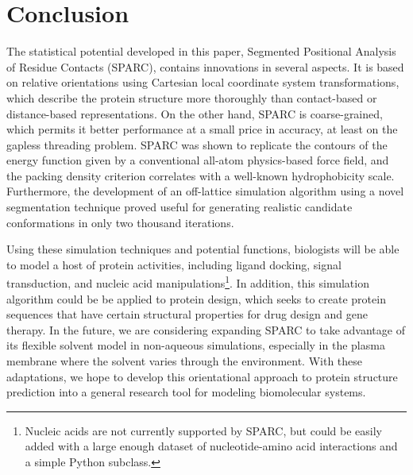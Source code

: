 \documentclass[11pt,titlepage]{article}
\begin{document}
\section{Conclusion}
The statistical potential developed in this paper, Segmented Positional Analysis of Residue Contacts (SPARC), contains innovations in several aspects. 
It is based on relative orientations using Cartesian local coordinate system transformations, which describe the protein structure more thoroughly than contact-based or distance-based representations.
On the other hand, SPARC is coarse-grained, which permits it better performance at a small price in accuracy, at least on the gapless threading problem.
SPARC was shown to replicate the contours of the energy function given by a conventional all-atom physics-based force field, and the packing density criterion correlates with a well-known hydrophobicity scale.
Furthermore, the development of an off-lattice simulation algorithm using a novel segmentation technique proved useful for generating realistic candidate conformations in only two thousand iterations.

Using these simulation techniques and potential functions, biologists will be able to model a host of protein activities, including ligand docking, signal transduction, and nucleic acid manipulations\footnote{Nucleic acids are not currently supported by SPARC, but could be easily added with a large enough dataset of nucleotide-amino acid interactions and a simple Python subclass.}.
In addition, this simulation algorithm could be be applied to protein design, which seeks to create protein sequences that have certain structural properties for drug design and gene therapy.
In the future, we are considering expanding SPARC to take advantage of its flexible solvent model in non-aqueous simulations, especially in the plasma membrane where the solvent varies through the environment.
With these adaptations, we hope to develop this orientational approach to protein structure prediction into a general research tool for modeling biomolecular systems.


{\footnotesize }
\end{document}
